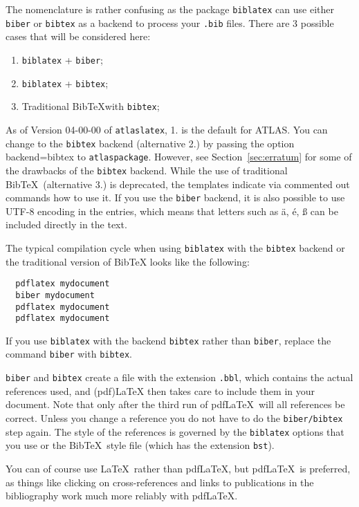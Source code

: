 \documentclass[UKenglish, texlive=2016]{\ATLASLATEXPATH atlasdoc}
\newcommand*{\BibTeX}{Bib\TeX}
\newcommand{\File}[1]{\texttt{#1}\xspace}
\newcommand{\Option}[1]{\textsf{#1}\xspace}
\newcommand{\Package}[1]{\texttt{#1}\xspace}
\begin{document}
The nomenclature is rather confusing as the package \Package{biblatex} can use
either \texttt{biber} or \texttt{bibtex} as a backend to process your \texttt{.bib} files.
There are 3 possible cases that will be considered here:
\begin{enumerate}\setlength{\itemsep}{0pt}\setlength{\parskip}{0pt}
  \item \texttt{biblatex} + \texttt{biber};
  \item \texttt{biblatex} + \texttt{bibtex};
  \item Traditional \BibTeX with \texttt{bibtex};
\end{enumerate}
As of Version 04-00-00 of \Package{atlaslatex}, 1. is the default for ATLAS.
You can change to the \texttt{bibtex} backend (alternative 2.) by passing the option
\Option{backend=bibtex} to \Package{atlaspackage}.
However, see Section~\ref{sec:erratum} for some of the drawbacks of the \texttt{bibtex} backend.
While the use of traditional \BibTeX\ (alternative 3.) is deprecated,
the templates indicate via commented out commands how to use it.
If you use the \texttt{biber} backend, it is also possible to use UTF-8 encoding in the entries, which means that letters such as
ä, é, ß can be included directly in the text.

The typical compilation cycle when using \Package{biblatex} with the \texttt{bibtex} backend
or the traditional version of \BibTeX{} looks like the following:
%
\begin{verbatim}
  pdflatex mydocument
  biber mydocument
  pdflatex mydocument
  pdflatex mydocument
\end{verbatim}
If you use \Package{biblatex} with the backend \Package{bibtex} rather than \Package{biber},
replace the command \texttt{biber} with \texttt{bibtex}.

\texttt{biber} and \texttt{bibtex} create a file with the extension \texttt{.bbl}, which
contains the actual references used, and (pdf)\LaTeX{} then takes care to include them in your document.
Note that only after the third run of pdf\LaTeX\ will all references be correct.
Unless you change a reference you do not have to do the \texttt{biber/bibtex} step again.
The style of the references is governed by the \Package{biblatex} options that you
use or the \BibTeX\ style file (which has the extension \File{bst}).

You can of course use \LaTeX\ rather than pdf\LaTeX, but pdf\LaTeX\ is preferred,
as things like clicking on cross-references and links to publications in the bibliography
work much more reliably with pdf\LaTeX.
\end{document}

